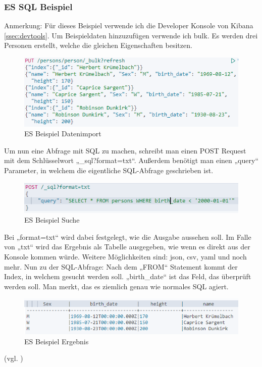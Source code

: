 \subsubsection{ES SQL Beispiel}
Anmerkung: Für dieses Beispiel verwende ich die Developer Konsole von Kibana \ref{ssec:devtools}.
Um Beispieldaten hinzuzufügen verwende ich bulk. Es werden drei Personen erstellt, welche die gleichen Eigenschaften besitzen.
\begin{figure}[H]
    \centering
    \includegraphics[scale=1.3]{images/es_sql_import.PNG}
    \caption{ES Beispiel Datenimport}
    \label{img:es_sql_import}
\end{figure}
Um nun eine Abfrage mit SQL zu machen, schreibt man einen POST Request mit dem Schlüsselwort „\_sql?format=txt“.
Außerdem benötigt man einen „query“ Parameter, in welchem die eigentliche SQL-Abfrage geschrieben ist. 
\begin{figure}[H]
    \centering
    \includegraphics[scale=1.3]{images/es_sql_query.PNG}
    \caption{ES Beispiel Suche}
    \label{img:es_sql_query}
\end{figure}
Bei „format=txt“ wird dabei festgelegt, wie die Ausgabe aussehen soll. Im Falle von „txt“ wird das Ergebnis als Tabelle ausgegeben, wie wenn es direkt aus der Konsole kommen würde. Weitere Möglichkeiten sind: json, csv, yaml und noch mehr.
Nun zu der SQL-Abfrage: Nach dem „FROM“ Statement kommt der Index, in welchem gesucht werden soll. „birth\_date“ ist das Feld, das überprüft werden soll. Man merkt, das es ziemlich genau wie normales SQL agiert.
\begin{figure}[H]
    \centering
    \includegraphics[scale=1.3]{images/es_sql_outputTxt.PNG}
    \caption{ES Beispiel Ergebnis}
    \label{img:es_sql_outputTxt}
\end{figure}
(vgl. \cite{EsSql})